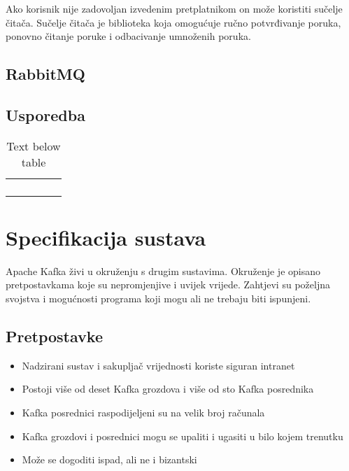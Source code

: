 \documentclass[times, utf8, diplomski, numeric]{fer}
\begin{document}
Ako korisnik nije zadovoljan izvedenim pretplatnikom on može koristiti sučelje čitača. Sučelje čitača je biblioteka koja omogućuje ručno potvrđivanje poruka, ponovno čitanje poruke i odbacivanje umnoženih poruka.

\section{RabbitMQ}

\section{Usporedba}

\begin{table}[]
\begin{tabular}{lllll}
 &  &  &  &  \\
 &  &  &  &  \\
 &  &  &  &  \\
 &  &  &  & 
\end{tabular}

\caption{Text below table}
\label{table:sample_table_label}

\end{table}

\chapter{Specifikacija sustava}

Apache Kafka živi u okruženju s drugim sustavima. Okruženje je opisano pretpostavkama koje su nepromjenjive i uvijek vrijede. Zahtjevi su poželjna svojstva i mogućnosti programa koji mogu ali ne trebaju biti ispunjeni.

\section{Pretpostavke}

\begin{itemize}
    \item Nadzirani sustav i sakupljač vrijednosti koriste siguran intranet
    \item Postoji više od deset Kafka grozdova i više od sto Kafka posrednika
    \item Kafka posrednici raspodijeljeni su na velik broj računala
    \item Kafka grozdovi i posrednici mogu se upaliti i ugasiti u bilo kojem trenutku
    \item Može se dogoditi ispad, ali ne i bizantski
\end{itemize}
\end{document}
